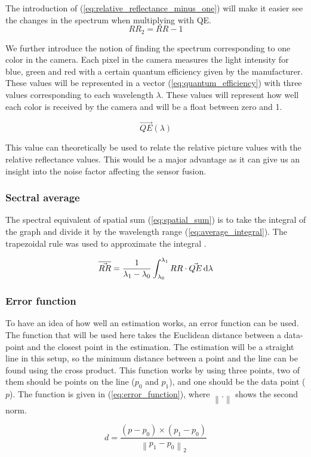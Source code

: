 The introduction of (\ref{eq:relative_reflectance_minus_one}) will make it easier see the changes in the spectrum when multiplying with QE.  
\begin{equation}
    \label{eq:relative_reflectance_minus_one}
    RR_2 = RR - 1
\end{equation}

We further introduce the notion of finding the spectrum corresponding to one color in the camera. Each pixel in the camera measures the light intensity for blue, green and red with a certain quantum efficiency given by the manufacturer. These values will be represented in a vector (\ref{eq:quantum_efficiency}) with three values corresponding to each wavelength $\lambda$. These values will represent how well each color is received by the camera and will be a float between zero and 1. 

\begin{equation}
    \label{eq:quantum_efficiency}
    \vec{QE}(\lambda)    
\end{equation}

This value can theoretically be used to relate the relative picture values with the relative reflectance values. This would be a major advantage as it can give us an insight into the noise factor affecting the sensor fusion.  

\subsubsection{Sectral average}
\label{sec:spectral_average}

The spectral equivalent of spatial sum (\ref{eq:spatial_sum}) is to take the integral of the graph and divide it by the wavelength range (\ref{eq:average_integral}). The trapezoidal rule was used to approximate the integral \cite{TrapezoidRuleMathematical}. 

\begin{equation}
    \label{eq:average_integral}
    \overline{\vec{RR}} = \frac{1}{\lambda_1 - \lambda_0} \int_{\lambda_0}^{\lambda_1} RR \cdot \vec{QE} \,\mathrm{d}\lambda 
\end{equation}


\subsubsection{Error function}
\label{sec:error_function}
To have an idea of how well an estimation works, an error function can be used. The function that will be used here takes the Euclidean distance between a data-point and the closest point in the estimation. The estimation will be a straight line in this setup, so the minimum distance between a point and the line can be found using the cross product. This function works by using three points, two of them should be points on the line ($p_0$ and $p_1$), and one should be the data point ($p$). The function is given in (\ref{eq:error_function}), where $\left\lVert .\right\rVert$ shows the second norm. 

\begin{equation}
    \label{eq:error_function}
    d = \frac{(p - p_0) \times (p_1 - p_0)}{\left\lVert p_1 - p_0\right\rVert _2}
\end{equation}